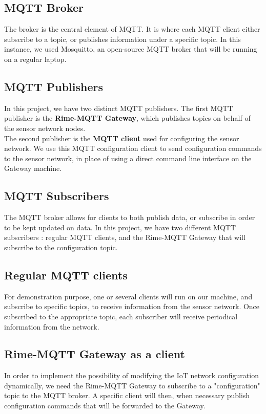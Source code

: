 \documentclass[a4paper,11pt]{article}
\begin{document}
\subsection{MQTT Broker}
The broker is the central element of MQTT. It is where each MQTT client either subscribe to a topic, or publishes information under a specific topic. In this instance, we used Mosquitto, an open-source MQTT broker that will be running on a regular laptop.


\subsection{MQTT Publishers}
In this project, we have two distinct MQTT publishers. The first MQTT publisher is the \textbf{Rime-MQTT Gateway}, which publishes topics on behalf of the sensor network nodes.\\

The second publisher is the \textbf{MQTT client} used for configuring the sensor network. We use this MQTT configuration client to send configuration commands to the sensor network, in place of using a direct command line interface on the Gateway machine.

\subsection{MQTT Subscribers}
The MQTT broker allows for clients to both publish data, or subscribe in order to be kept updated on data. In this project, we have two different MQTT subscribers : regular MQTT clients, and the Rime-MQTT Gateway that will subscribe to the configuration topic.

\subsection{Regular MQTT clients}
For demonstration purpose, one or several clients will run on our machine, and subscribe to specific topics, to receive information from the sensor network. Once subscribed to the appropriate topic, each subscriber will receive periodical information from the network.

\subsection{Rime-MQTT Gateway as a client}
In order to implement the possibility of modifying the IoT network configuration dynamically, we need the Rime-MQTT Gateway to subscribe to a "configuration" topic to the MQTT broker. A specific client will then, when necessary publish configuration commands that will be forwarded to the Gateway.
\end{document}
